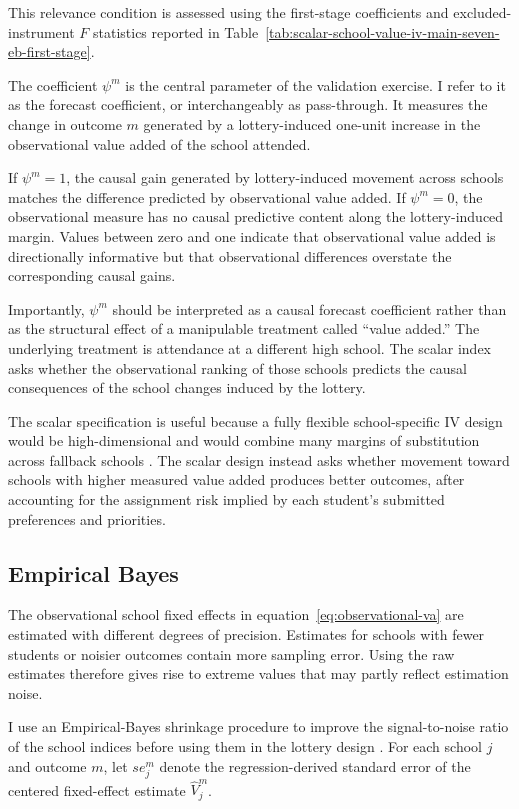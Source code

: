 \documentclass[a4paper, article, english, oneside, unknownkeysallowed, 12pt]{memoir}
\begin{document}
This relevance condition is assessed using the first-stage coefficients and excluded-instrument
$F$ statistics reported in Table~\ref{tab:scalar-school-value-iv-main-seven-eb-first-stage}.

The coefficient $\psi^m$ is the central parameter of the validation exercise. I refer to it
as the forecast coefficient, or interchangeably as pass-through. It measures the change in
outcome $m$ generated by a lottery-induced one-unit increase in the observational value
added of the school attended.

If $\psi^m=1$, the causal gain generated by lottery-induced movement across schools
matches the difference predicted by observational value added. If $\psi^m=0$, the
observational measure has no causal predictive content along the lottery-induced margin.
Values between zero and one indicate that observational value added is directionally
informative but that observational differences overstate the corresponding causal gains.

Importantly, $\psi^m$ should be interpreted as a causal forecast coefficient rather than
as the structural effect of a manipulable treatment called ``value added.'' The underlying
treatment is attendance at a different high school. The scalar index asks whether the
observational ranking of those schools predicts the causal consequences of the school
changes induced by the lottery.

The scalar specification is useful because a fully flexible school-specific IV design would
be high-dimensional and would combine many margins of substitution across fallback
schools \parencite{angrist_methods_2023,kirkeboen_field_2016}. The scalar design instead
asks whether movement toward schools with higher measured value added produces better
outcomes, after accounting for the assignment risk implied by each student's submitted
preferences and priorities.


\subsection{Empirical Bayes}

The observational school fixed effects in equation~\eqref{eq:observational-va} are
estimated with different degrees of precision. Estimates for schools with fewer students
or noisier outcomes contain more sampling error. Using the raw estimates therefore gives
rise to extreme values that may partly reflect estimation noise.

I use an Empirical-Bayes shrinkage procedure to improve the signal-to-noise ratio of the
school indices before using them in the lottery design
\parencite{walters_chapter_2024}. For each school $j$ and outcome $m$, let $se_j^m$
denote the regression-derived standard error of the centered fixed-effect estimate
$\widehat V_j^m$.
\end{document}
